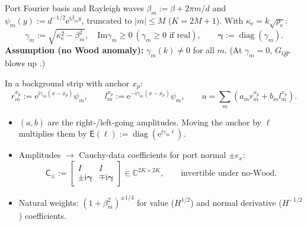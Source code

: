 \documentclass[aspectratio=169]{beamer}
\renewcommand{\Im}{\mathrm{Im}}
\newcommand{\ii}{\mathrm{i}}
\newcommand{\ee}{\mathrm{e}}
\newcommand{\CC}{\mathbb{C}}
\newcommand{\QP}{\mathrm{QP}}
\begin{document}
\begin{frame}{Port Fourier basis and Rayleigh waves}
  \footnotesize
  $\beta_m:=\beta+2\pi m/d$ and $\psi_m(y):=d^{-1/2}\ee^{\ii\beta_my}$, truncated to $|m|\le M$
  ($K=2M+1$). With $\kappa_{\mathrm e}=k\sqrt{\rho_{\mathrm e}}$:
  \[
    \gamma_m:=\sqrt{\kappa_{\mathrm e}^2-\beta_m^2},\quad\Im\gamma_m\ge0\
    (\gamma_m\ge0\text{ if real}),\qquad
    \boldsymbol\gamma:=\operatorname{diag}(\gamma_m).
  \]
  \textbf{Assumption (no Wood anomaly):} $\gamma_m(k)\neq0$ for all $m$. (At
  $\gamma_m=0$, $G_\QP$ blows up \cite{BarnettGreengard2010}.)

  \medskip

  In a background strip with anchor $x_p$:
  \[
    r_m^{x_p}:=\ee^{\ii\gamma_m(x-x_p)}\psi_m,\qquad
    l_m^{x_p}:=\ee^{-\ii\gamma_m(x-x_p)}\psi_m,\qquad
    u=\sum_m(a_mr_m^{x_p}+b_ml_m^{x_p}).
  \]
  \begin{itemize}
    \item $(a,b)$ are the right-/left-going amplitudes. Moving the anchor by $\ell$
      multiplies them by $\mathsf E(\ell):=\operatorname{diag}(\ee^{\ii\gamma_m\ell})$.
    \item Amplitudes $\to$ Cauchy-data coefficients for port normal $\pm e_x$:
      \[
        \mathsf C_\pm:=\begin{bmatrix}I&I\\ \pm\ii\boldsymbol\gamma&\mp\ii\boldsymbol\gamma\end{bmatrix}
        \in\CC^{2K\times2K},\qquad\text{invertible under no-Wood.}
      \]
    \item Natural weights: $(1+\beta_m^2)^{\pm1/4}$ for value ($H^{1/2}$) and normal
      derivative ($H^{-1/2}$) coefficients.
  \end{itemize}
\end{frame}
\end{document}
